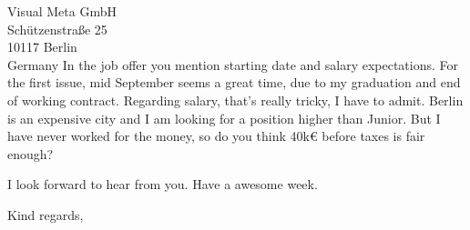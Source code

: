 \documentclass[a4paper]{letter}
\begin{document}
\begin{letter}{Visual Meta GmbH\\Schützenstraße 25\\10117 Berlin\\Germany}
In the job offer you mention starting date and salary expectations. For the
first issue, mid September seems a great time, due to my graduation and end of
working contract. Regarding salary, that's really tricky, I have to admit.
Berlin is an expensive city and I am looking for a position higher than Junior.
But I have never worked for the money, so do you think 40k€ before taxes is fair
enough?

I look forward to hear from you. Have a awesome week.
\closing{Kind regards,}
\end{letter}
\end{document}
